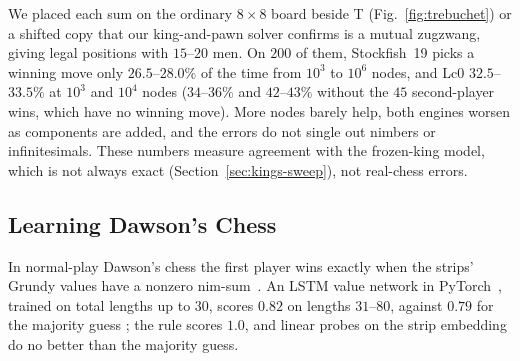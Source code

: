 We placed each sum on the ordinary $8\times8$ board beside T (Fig.~\ref{fig:trebuchet}) or a shifted copy that our
king-and-pawn solver confirms is a mutual zugzwang, giving legal positions with $15$--$20$ men. On $200$ of
them, Stockfish~19 picks a winning move only $26.5$--$28.0\%$ of the time from $10^3$ to $10^6$ nodes, and Lc0
$32.5$--$33.5\%$ at $10^3$ and $10^4$ nodes  ($34$--$36\%$ and $42$--$43\%$ without the $45$
second-player wins, which have no winning move). More nodes barely help, both engines worsen as components are
added, and the errors do not single out nimbers or infinitesimals. These numbers measure agreement with the
frozen-king model, which is not always exact (Section~\ref{sec:kings-sweep}), not real-chess errors.

\subsection{Learning Dawson's Chess}

In normal-play Dawson's chess the first player wins exactly when the strips' Grundy values have a nonzero
nim-sum~\cite{GuySmith1956,WinningWays}. An LSTM value network in PyTorch~\cite{PyTorch}, trained on total lengths up to
$30$, scores $0.82$ on lengths $31$--$80$, against $0.79$ for the majority guess ; the rule scores $1.0$,
and linear probes on the strip embedding do no better than the majority guess.
